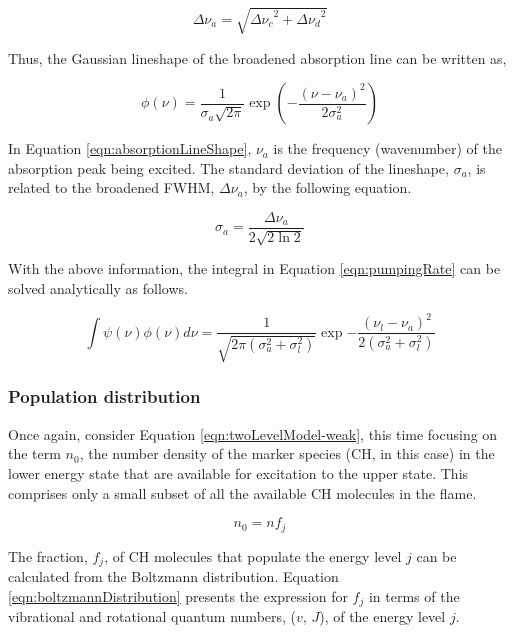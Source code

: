 \begin{equation}
  \Delta\nu_a = \sqrt{ { \Delta\nu_c }^2 + { \Delta\nu_d }^2 }
  \label{eqn:broadening}
\end{equation}

Thus, the Gaussian lineshape of the broadened absorption line can be written as,

\begin{equation}
  \phi(\nu) = \frac{1}{\sigma_a\sqrt{2\pi}} \exp{\left(-\dfrac{(\nu-\nu_a)^2}{2\sigma_a^2}\right)}
  \label{eqn:absorptionLineShape}
\end{equation}

In Equation \ref{eqn:absorptionLineShape}, \(\nu_a\) is the frequency (wavenumber) of the absorption peak being excited.
The standard deviation of the lineshape, \(\sigma_a\), is related to the broadened FWHM, \(\Delta\nu_a\), by the following equation.

\begin{equation}
  \sigma_a = \frac{\Delta\nu_a}{2 \sqrt{ 2 \ln{2} } }
\end{equation}

With the above information, the integral in Equation \ref{eqn:pumpingRate} can be solved analytically as follows.

\begin{equation}
  \int \psi(\nu) \phi(\nu) d\nu = \frac{1}{\sqrt{2\pi ( \sigma_a^2 + \sigma_l^2 )}} \exp{-\frac{ (\nu_l - \nu_a )^2 }{2 ( \sigma_a^2 + \sigma_l^2 )}}
  \label{eqn:absorptionIntegral}
\end{equation}

\subsubsection{Population distribution}

Once again, consider Equation \ref{eqn:twoLevelModel-weak}, this time focusing on the term \(n_0\), the number density of the marker species (CH, in this case) in the lower energy state that are available for excitation to the upper state.
This comprises only a small subset of all the available CH molecules in the flame.

\begin{equation}
  n_0 = nf_j
  \label{eqn:boltzmannFraction}
\end{equation}

The fraction, \(f_j\), of CH molecules that populate the energy level \(j\) can be calculated from the Boltzmann distribution.
Equation \ref{eqn:boltzmannDistribution} presents the expression for \(f_j\) in terms of the vibrational and rotational quantum numbers, (\(v\), \(J\)), of the energy level \(j\).

